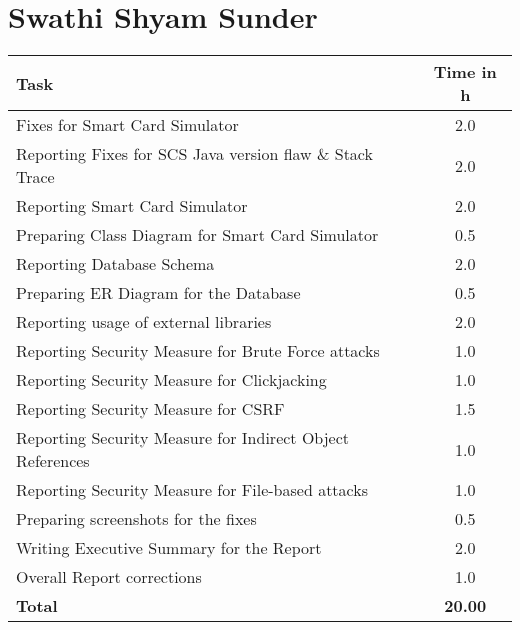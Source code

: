 \section{Swathi Shyam Sunder}
\begin{table}[H]
\tiny
\begin{tabular*}{\textwidth}{@{\extracolsep{\fill}} l c@{\extracolsep{0pt}} }
\textbf{Task} & \textbf{Time in h} \\ \hline
Fixes for Smart Card Simulator & 2.0 \\
Reporting Fixes for SCS Java version flaw \& Stack Trace & 2.0 \\
Reporting Smart Card Simulator & 2.0 \\
Preparing Class Diagram for Smart Card Simulator & 0.5 \\
Reporting Database Schema & 2.0 \\
Preparing ER Diagram for the Database & 0.5 \\
Reporting usage of external libraries & 2.0 \\
Reporting Security Measure for Brute Force attacks & 1.0 \\
Reporting Security Measure for Clickjacking & 1.0 \\
Reporting Security Measure for CSRF & 1.5 \\
Reporting Security Measure for Indirect Object References & 1.0 \\
Reporting Security Measure for File-based attacks & 1.0 \\
Preparing screenshots for the fixes & 0.5 \\
Writing Executive Summary for the Report & 2.0 \\
Overall Report corrections & 1.0 \\
\hline\hline
\textbf{Total}								& \textbf{20.00}
\end{tabular*}
\end{table}
